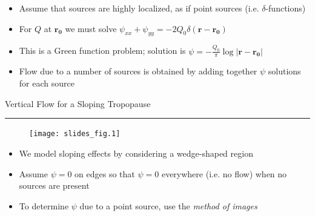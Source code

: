 \documentclass[landscape]{seminar}
\begin{document}
\begin{slide}

\begin{itemize}
\item Assume that sources are highly localized, as if point sources (i.e. $\delta$-functions)

\item For $Q$ at $\mathbf{r_{\scriptscriptstyle 0}}$ we must solve 
$\psi_{xx} + \psi_{yy} = -2 Q_0 \delta(\mathbf{r - r_{\scriptscriptstyle 0}})$

\item This is a Green function problem; solution is $\psi = -\frac{Q_0}{\pi} \log |\mathbf{r - r_{\scriptscriptstyle 0}}|$

\item Flow due to a number of sources is obtained by adding together $\psi$ solutions for each source
\end{itemize}

\end{slide}
\begin{slide}

\begin{center}
{\color{darkblue} \large Vertical Flow for a Sloping Tropopause \\ \rule[0.15in]{\textwidth}{.03in}}

\begin{figure}
\texttt{[image: slides\_fig.1]}
\end{figure}
\end{center}

\begin{itemize}
\item We model sloping effects by considering a wedge-shaped region

\item Assume $\psi=0$ on edges so that $\psi = 0$ everywhere (i.e. no flow) when no sources are present

\item To determine $\psi$ due to a point source, use the \emph{method of images}
\end{itemize}

\end{slide}
\end{document}
